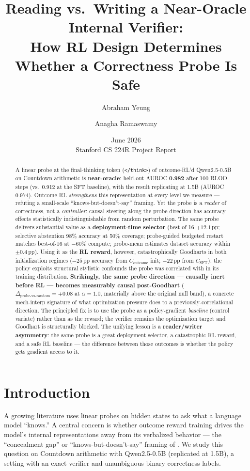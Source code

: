 \documentclass[11pt]{article}
\title{Reading vs.\ Writing a Near-Oracle Internal Verifier:\\
How RL Design Determines Whether a Correctness Probe Is Safe}
\author{Abraham Yeung \and Anagha Ramaswamy}
\date{June 2026 \\ Stanford CS 224R Project Report}
\begin{document}
\maketitle

\begin{abstract}
A linear probe at the final-thinking token (\texttt{</think>}) of outcome-RL'd Qwen2.5-0.5B on Countdown arithmetic is \textbf{near-oracle}: held-out AUROC \textbf{0.982} after 100 RLOO steps (vs.\ 0.912 at the SFT baseline), with the result replicating at 1.5B (AUROC 0.974). Outcome RL \emph{strengthens} this representation at every level we measure --- refuting a small-scale ``knows-but-doesn't-say'' framing. Yet the probe is a \emph{reader} of correctness, not a \emph{controller}: causal steering along the probe direction has accuracy effects statistically indistinguishable from random perturbation. The same probe delivers substantial value as a \textbf{deployment-time selector} (best-of-16 $+12.1$\,pp; selective abstention 98\% accuracy at 50\% coverage; probe-guided budgeted restart matches best-of-16 at $-60\%$ compute; probe-mean estimates dataset accuracy within $\pm 0.4$\,pp). Using it as the \textbf{RL reward}, however, catastrophically Goodharts in both initialization regimes ($-25$\,pp accuracy from $C_{\text{outcome}}$ init; $-22$\,pp from $C_{\text{SFT}}$); the policy exploits structural stylistic confounds the probe was correlated with in its training distribution. \textbf{Strikingly, the same probe direction --- causally inert before RL --- becomes measurably causal post-Goodhart} ($\Delta_{\text{probe-vs-random}}=+0.08$ at $\alpha{=}1.0$, materially above the original null band), a concrete mech-interp signature of what optimization pressure does to a previously-correlational direction. The principled fix is to use the probe as a policy-gradient \emph{baseline} (control variate) rather than as the reward; the verifier remains the optimization target and Goodhart is structurally blocked. The unifying lesson is a \textbf{reader/writer asymmetry}: the same probe is a great deployment selector, a catastrophic RL reward, and a safe RL baseline --- the difference between those outcomes is whether the policy gets gradient access to it.
\end{abstract}

\section{Introduction}

A growing literature uses linear probes on hidden states to ask what a language model ``knows.'' A central concern is whether outcome reward training drives the model's internal representations away from its verbalized behavior --- the ``concealment gap'' or ``knows-but-doesn't-say'' framing of \citet{yuan2024probing}. We study this question on Countdown arithmetic with Qwen2.5-0.5B (replicated at 1.5B), a setting with an exact verifier and unambiguous binary correctness labels.
\end{document}
